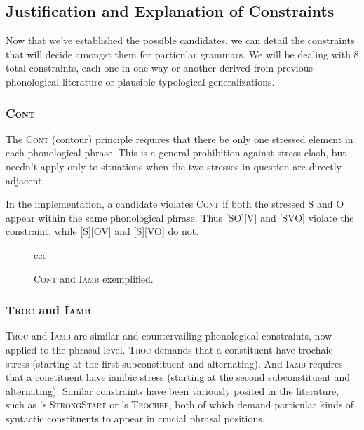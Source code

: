 \documentclass{article}
\newcommand{\cont}{\textsc{Cont}}
\newcommand{\iamb}{\textsc{Iamb}}
\newcommand{\troc}{\textsc{Troc}}
\begin{document}
\subsection{Justification and Explanation of Constraints\label{straints}}

Now that we've established the possible candidates, we can detail the constraints that will decide amongst them for particular grammars.
We will be dealing with 8 total constraints, each one in one way or another derived from previous phonological literature or plausible typological generalizations.

\subsubsection{\cont}

The {\cont} (contour) principle requires that there be only one stressed element in each phonological phrase.
This is a general prohibition against stress-clash, but needn't apply only to situations when the two stresses in question are directly adjacent.

In the implementation, a candidate violates {\cont} if both the stressed S and O appear within the same phonological phrase.
Thus [SO][V] and [SVO] violate the constraint, while [S][OV] and [S][VO] do not.

\begin{figure}
\begin{center}
\begin{tableau}{ccc}
		\const{\cont}	\const{\iamb}
	\cand[\Optimal]{[S][OV]} \vio{}		\vio{}
	\cand{[S][VO]} \vio{}		\vio{*!}
	\cand{[SO][V]} \vio{*!}\vio{}
	\cand{[SOV]} \vio{*!}\vio{}
	\cand{[SVO]} \vio{*!}	\vio{*}
\end{tableau}
\end{center}
	\caption{\cont{} and {\iamb} exemplified.}
\end{figure}

\subsubsection{{\troc} and {\iamb}}

{\troc} and {\iamb} are similar and countervailing phonological constraints, now applied to the phrasal level.
{\troc} demands that a constituent have trochaic stress (starting at the first subconstituent and alternating).
And {\iamb} requires that a constituent have iambic stress (starting at the second subconstituent and alternating).
Similar constraints have been variously posited in the literature, such as \textcite{selkirk11}'s \textsc{StrongStart} or \textcite{fitzgerald94}'s \textsc{Trochee}, both of which demand particular kinds of syntactic constituents to appear in crucial phrasal positions.
\end{document}
